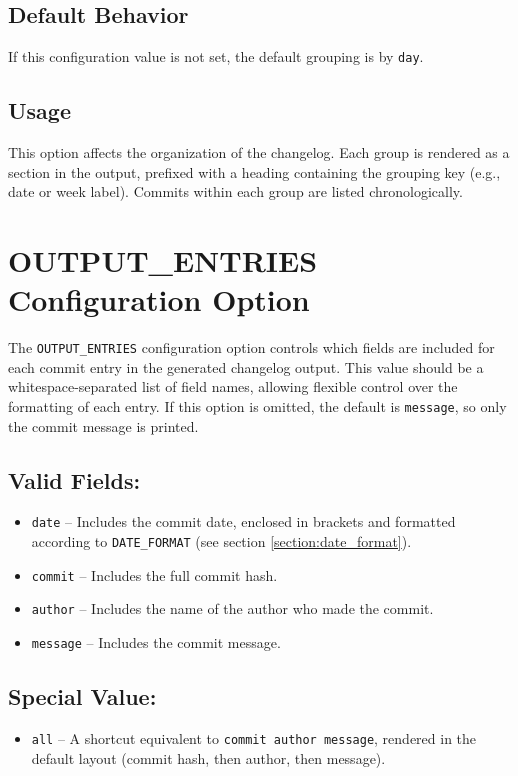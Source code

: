 \subsection*{Default Behavior}
If this configuration value is not set, the default grouping is by \texttt{day}.

\subsection*{Usage}
This option affects the organization of the changelog. Each group is rendered as a section in the output, prefixed with a heading containing the grouping key (e.g., date or week label). Commits within each group are listed chronologically.









\section{OUTPUT\_ENTRIES Configuration Option}

The \texttt{OUTPUT\_ENTRIES} configuration option controls which fields are included for each commit entry in the generated changelog output. This value should be a whitespace-separated list of field names, allowing flexible control over the formatting of each entry. If this option is omitted, the default is \texttt{message}, so only the commit message is printed.

\subsection*{Valid Fields:}
\begin{itemize}
	\item \texttt{date} -- Includes the commit date, enclosed in brackets and formatted according to \texttt{DATE\_FORMAT} (see section \ref{section:date_format}).
	\item \texttt{commit} -- Includes the full commit hash.
	\item \texttt{author} -- Includes the name of the author who made the commit.
	\item \texttt{message} -- Includes the commit message.
\end{itemize}

\subsection*{Special Value:}
\begin{itemize}
	\item \texttt{all} -- A shortcut equivalent to \texttt{commit author message}, rendered in the default layout (commit hash, then author, then message).
\end{itemize}

